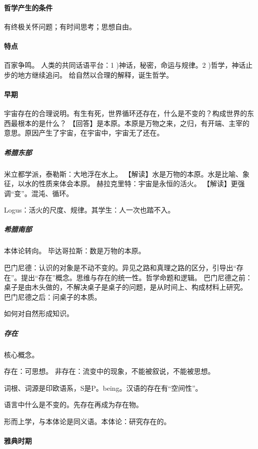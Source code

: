 \documentclass[UTF8]{../RepresentationUniverse}
\begin{document}
    \paragraph{哲学产生的条件}
    有终极关怀问题；有时间思考；思想自由。

    \paragraph{特点}
    百家争鸣。
    人类的共同话语平台：1 )神话，秘密，命运与规律。2 )哲学，神话止步的地方继续追问。
    给自然以合理的解释，诞生哲学。


    \paragraph{早期}
    宇宙存在的合理说明。有生有死，世界循环还存在，什么是不变的？构成世界的东西最根本的是什么？
    【回答】是本原。本原是万物之来，之归，有开端、主宰的意思。原因产生了宇宙，在宇宙中，宇宙无了还在。


    \subparagraph{希腊东部}
    米立都学派，泰勒斯：大地浮在水上。
    【解读】水是万物的本原。水是比喻、象征，以水的性质来体会本原。
    赫拉克里特：宇宙是永恒的活火。
    【解读】更强调“变”。混沌、循环。

    Logus：活火的尺度、规律。其学生：人一次也踏不入。


    \subparagraph{希腊南部}

    本体论转向。
    毕达哥拉斯：数是万物的本原。

    巴门尼德：认识的对象是不动不变的。异见之路和真理之路的区分，引导出“存在”。提出“存在”概念。思维与存在的统一性。哲学命题和逻辑。
    巴门尼德之前：桌子是由木头做的，不解决桌子是桌子的问题，是从时间上、构成材料上研究。
    巴门尼德之后：问桌子的本质。

    如何对自然形成知识。

    \subparagraph{存在}

    核心概念。

    存在：可思想。
    非存在：流变中的现象，不能被叙说，不能被思想。

    词根、词源是印欧语系，S是P。being。汉语的存在有“空间性”。

    语言中什么是不变的。先存在再成为存在物。

    形而上学，与本体论是同义语。本体论：研究存在的。

    
    \paragraph{雅典时期}
\end{document}

